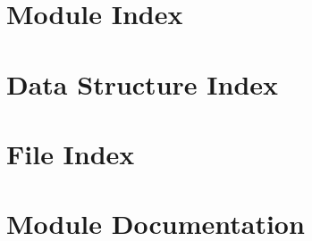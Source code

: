 \let\mypdfximage\pdfximage\def\pdfximage{\immediate\mypdfximage}\documentclass[twoside]{book}
\newcommand{\+}{\discretionary{\mbox{\scriptsize$\hookleftarrow$}}{}{}}
\begin{document}
\chapter{Module Index}

\chapter{Data Structure Index}

\chapter{File Index}

\chapter{Module Documentation}











































\end{document}
